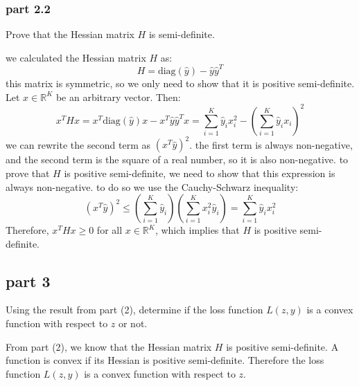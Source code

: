 \subsubsection{part 2.2}
Prove that the Hessian matrix \( H \) is semi-definite.
\begin{qsolve}
	\begin{qsolve}[]
		we calculated the Hessian matrix \( H \) as:
		\[
		H = \text{diag}(\hat{y}) - \hat{y} \hat{y}^T
		\]
		this matrix is symmetric, so we only need to show that it is positive semi-definite. Let \( x \in \mathbb{R}^K \) be an arbitrary vector. Then:
		\[
		x^T H x = x^T \text{diag}(\hat{y}) x - x^T \hat{y} \hat{y}^T x = \sum_{i=1}^K \hat{y}_i x_i^2 - \left( \sum_{i=1}^K \hat{y}_i x_i \right)^2
		\]
		we can rewrite the second term as \( (x^T \hat{y})^2 \).
		the first term is always non-negative, and the second term is the square of a real number, so it is also non-negative. to prove that \( H \) is positive semi-definite, we need to show that this expression is always non-negative. to do so we use the Cauchy-Schwarz inequality:
		\[
		(x^T \hat{y})^2 \leq \left(\sum_{i=1}^{K}\hat{y}_i\right) \left(\sum_{i=1}^{K}x_i^2\hat{y}_i\right) = \sum_{i=1}^{K}\hat{y}_i x_i^2
		\]
		Therefore, \( x^T H x \geq 0 \) for all \( x \in \mathbb{R}^K \), which implies that \( H \) is positive semi-definite.
	\end{qsolve}
\end{qsolve}
\subsection{part 3}
Using the result from part (2), determine if the loss function \( L(z, y) \) is a convex function with respect to \( z \) or not.
\begin{qsolve}
	\begin{qsolve}[]
		From part (2), we know that the Hessian matrix \( H \) is positive semi-definite. A function is convex if its Hessian is positive semi-definite. Therefore the loss function \( L(z, y) \) is a convex function with respect to \( z \).
	\end{qsolve}
\end{qsolve}